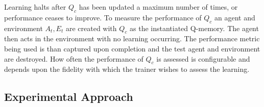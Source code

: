 \documentclass[jair,twoside,11pt,theapa]{article}
\begin{document}
Learning halts after $Q_c$ has been updated a maximum number of times, or performance ceases to improve. To measure the performance of $Q_c$ an agent 
and environment $A_t, E_t$ are created with $Q_c$ as the instantiated Q-memory. The agent then acts in the environment with no learning occurring. 
The performance metric being used is than captured upon completion and the test agent and environment are destroyed. How often the performance of $Q_c$ 
is assessed is configurable and depends upon the fidelity with which the trainer wishes to assess the learning. 


\subsection{Experimental Approach}
\label{experiments}







\vskip 0.2in


\end{document}
